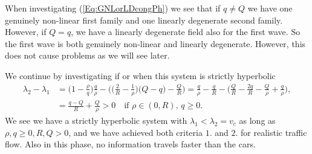 \documentclass[10pt]{article}
\numberwithin{equation}{section}
\begin{document}
When investigating (\ref{Eq:GNLorLDcongPh}) we see that if $q \neq Q$ we have one genuinely non-linear first family and one linearly degenerate second family. However, if $ Q = q$, we have a linearly degenerate field also for the first wave. So the first wave is both genuinely non-linear and linearly degenerate. However, this does not cause problems as we will see later.

We continue by investigating if or when this system is strictly hyperbolic
\begin{align*}
    \lambda_2 - \lambda_1 &= \big(1 - \frac{\rho}{q}\big)\frac{q}{\rho} - \bigg(\big ( \frac{2}{R} - \frac{1}{\rho} )\big (Q- q) - \frac{Q}{R} \bigg) = \frac{q}{\rho} - \frac{q}{R}- \bigg( \frac{Q}{R} - \frac{2q}{R} - \frac{Q}{\rho} + \frac{q}{\rho}\bigg) , \\
                        &= \frac{q- Q }{R} + \frac{Q}{\rho} > 0 \quad \text{if $\rho \in (0,R)$, $q \geq 0$} .
\end{align*}
We see we have a strictly hyperbolic system with $\lambda_1 < \lambda_2 = v_c$ as long as $\rho,q \geq 0, R, Q > 0$, and we have achieved both criteria $1. $ and $2.$ for realistic traffic flow.  Also in this phase, no information travels faster than the cars. 
\end{document}
